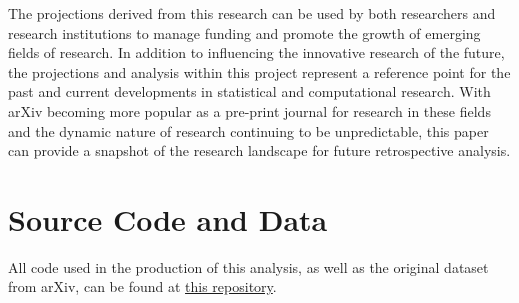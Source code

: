 \documentclass[
  12pt]{article}
\begin{document}
The projections derived from this research can be used by both
researchers and research institutions to manage funding and promote the
growth of emerging fields of research. In addition to influencing the
innovative research of the future, the projections and analysis within
this project represent a reference point for the past and current
developments in statistical and computational research. With arXiv
becoming more popular as a pre-print journal for research in these
fields and the dynamic nature of research continuing to be
unpredictable, this paper can provide a snapshot of the research
landscape for future retrospective analysis.

\section{Source Code and Data}\label{source-code-and-data}

All code used in the production of this analysis, as well as the
original dataset from arXiv, can be found at
\href{https://github.com/narenp12/stats140finalproj}{this repository}.


  
\end{document}
